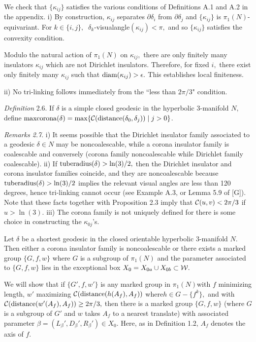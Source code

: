  We check that $\{\kappa_{ij}\}$ satisfies
the various conditions of
Definitions A.1 and A.2 in the appendix.
i)  By construction, $\kappa_{ij}$ separates $\partial \delta_i$
from $\partial \delta_j$ and $\{\kappa_{ij}\}$ is $\pi_1(N)$-equivariant.
For $k\in \{i,j\},\ $
$\delta_k$-visualangle$(\kappa_{ij})<\pi,$ and so $\{\kappa_{ij}\}$
satisfies the convexity
condition.

Modulo the natural action of $\pi_1(N)$ on  $\kappa_{ij},$
there are only finitely many insulators $\kappa_{ij}$ which are not
Dirichlet insulators.  Therefore, for fixed $i,$ there exist
only finitely many $\kappa_{ij}$ such that ${\rm
diam}(\kappa_{ij})>\epsilon.$  This
establishes local finiteness. 

ii) No tri-linking follows immediately from the ``less than
 $2\pi/3$" condition.\enddemo

{\it Definition} 2.6. If $\delta$ is a simple closed
geodesic in the hyperbolic
3-manifold $N,$ define ${\rm maxcorona}(\delta)=\max\{{\cal C}({\rm distance}
(\delta_0, \delta_j))\mid j>0\}$.

 {\it Remarks {\rm 2.7}}. i)  It seems possible that the
Dirichlet insulator family
associated to a geodesic $\delta\in N$ may be noncoalescable, while a
corona insulator family is coalescable and conversely (corona family
noncoalescable while Dirichlet family coalescable).
ii) If ${\rm tuberadius}(\delta)>\ln(3)/2,$ then the Dirichlet insulator
and corona insulator families coincide, and
 they are noncoalescable because ${\rm tuberadius}(\delta)>\ln(3)/2$
implies the relevant visual angles are less than 120 degrees, hence
tri-linking cannot occur
(see Example A.3, or Lemma 5.9 of [G]).  Note that these facts
together with Proposition 2.3 imply that
${\cal C}(u,v)<2\pi/3$ if $u>\ln(3)$.
iii)  The corona family is not uniquely defined for there is some
choice in constructing the $\kappa_{0j}$'s.
 


 Let $\delta$ be a shortest
geodesic in the closed orientable
hyperbolic $3$\/{\rm -}\/manifold $N.$  Then either a corona insulator family is
noncoalescable or there exists a marked group $\{G,f,w\}$ where $G$ is a
subgroup of $\pi_1(N)$
and  the parameter associated to
$\{G,f,w\}$ lies in the exceptional box  
$X_0= X_{0a} \cup X_{0b} \subset {\cal W}.$
\endproclaim

We will show that if $\{G',f,w'\}$ is any marked group in
$\pi_1(N)$\break with $f$ minimizing length,
$w'$ maximizing ${\cal C}({\rm distance} (h(A_f), A_f))$
where\break $h\in G-\{f^k\},$ and with ${\cal
C}({\rm distance} (w'(A_f), A_f)) \ge 2\pi/3,$
then there is a marked group $\{G,f,w\}$ 
(where $G$ is a subgroup of $G'$
and $w$ takes $A_f$ to a nearest translate) with
associated parameter
$\beta=(L_\beta', D_\beta', R_\beta')\in X_0.$
Here, as in Definition 1.2, $A_f$ denotes the axis of $f$.


